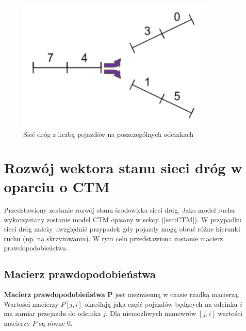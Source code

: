 \documentclass[12pt]{book}
\theoremstyle{plain}
\newcommand{\myref}[1]{(\ref{#1})}
\begin{document}
\begin{figure}[H]
	\centering
	\includegraphics[width=10cm]{images/env_11_743015}
	\caption{Sieć dróg z liczbą pojazdów na poszczególnych odcinkach}
	\label{fig:3_single_road}
\end{figure}

\section{Rozwój wektora stanu sieci dróg w oparciu o CTM}
Przedstawiony zostanie rozwój stanu środowiska sieci dróg. Jako model ruchu wykorzystany zostanie model CTM opisany w sekcji \myref{sec:CTM}. W przypadku sieci dróg należy uwzględnić przypadek  gdy pojazdy mogą obrać różne kierunki ruchu (np. na skrzyżowaniu). W tym celu przedstawiona zostanie macierz prawdopodobieństwa. 
\subsection{Macierz prawdopodobieństwa} \label{sec:macierz_prawd}
\textbf{Macierz prawdopodobieństwa} \textbf{P} jest niezmienną w czasie rzadką macierzą. Wartości macierzy $P[j,i]$ określają jaka część pojazdów będących na odcinku $i$ ma zamiar przejazdu do odcinka $j$. Dla niemożliwych manewrów $[j,i]$ wartości macierzy $P$ są równe 0.
\end{document}
